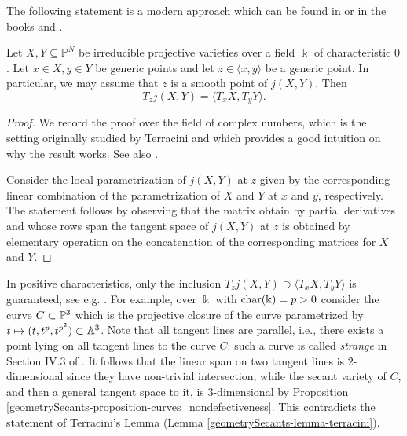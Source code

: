 The following statement is a modern approach which can be found in \cite[Corollary 1.10]{Adl87} or in the books \cite[Proposition II.1.10]{Zak93} and \cite[Theorem 1.4.1]{Rus16}.

\begin{lemma}
\label{geometrySecants-lemma-terracini}
    Let $X, Y \subseteq \mathbb{P}^N$ be irreducible projective varieties over a field $\Bbbk$ of characteristic $0$. Let $x \in X, y \in Y$ be generic points and let $z \in \langle x,y \rangle$ be a generic point. In particular, we may assume that $z$ is a smooth point of $j(X,Y)$. Then
    \[
        T_{z} j(X,Y) = \langle T_x X , T_y Y\rangle.
    \]
\end{lemma}
\begin{proof}
We record the proof over the field of complex numbers, which is the setting originally studied by Terracini and which provides a good intuition on why the result works. See also \cite{BO08}. 

Consider the local parametrization of $j(X,Y)$ at $z$ given by the corresponding linear combination of the parametrization of $X$ and $Y$ at $x$ and $y$, respectively. The statement follows by observing that the matrix obtain by partial derivatives and whose rows span the tangent space of $j(X,Y)$ at $z$ is obtained by elementary operation on the concatenation of the corresponding matrices for $X$ and $Y$. 
\end{proof}

\begin{example}
\label{geometrySecants-example-terracini_positive_char}
    In positive characteristics, only the inclusion $T_{z} j(X,Y) \supset \langle T_x X , T_y Y\rangle$ is guaranteed, see e.g. \cite[Proposition II.1.12]{Zak93}. For example, over $\Bbbk$ with ${\rm char}(\Bbbk)= p > 0$ consider the curve $C \subset \mathbb{P}^3$ which is the projective closure of the curve parametrized by $t \mapsto (t,t^p,t^{p^2}) \subset \mathbb{A}^3$. Note that all tangent lines are parallel, i.e., there exists a point lying on all tangent lines to the curve $C$: such a curve is called {\it strange} in Section IV.3 of \cite{Har77}. It follows that the linear span on two tangent lines is $2$-dimensional since they have non-trivial intersection, while the secant variety of $C$, and then a general tangent space to it, is $3$-dimensional by Proposition \ref{geometrySecants-proposition-curves_nondefectiveness}. This contradicts the statement of Terracini's Lemma (Lemma \ref{geometrySecants-lemma-terracini}).
\end{example}

